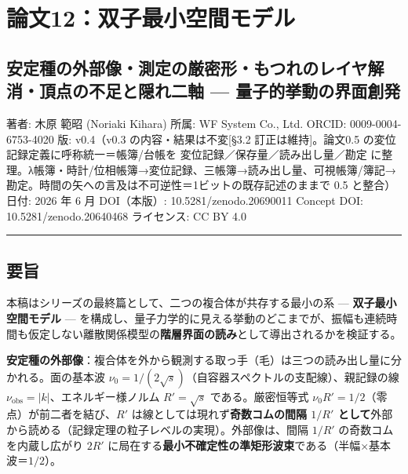 \documentclass[
]{ltjsarticle}
\author{}
\date{}
\begin{document}
\section{論文12：双子最小空間モデル}\label{ux8ad6ux658712ux53ccux5b50ux6700ux5c0fux7a7aux9593ux30e2ux30c7ux30eb}

\subsection{安定種の外部像・測定の厳密形・もつれのレイヤ解消・頂点の不足と隠れ二軸
---
量子的挙動の界面創発}\label{ux5b89ux5b9aux7a2eux306eux5916ux90e8ux50cfux6e2cux5b9aux306eux53b3ux5bc6ux5f62ux3082ux3064ux308cux306eux30ecux30a4ux30e4ux89e3ux6d88ux9802ux70b9ux306eux4e0dux8db3ux3068ux96a0ux308cux4e8cux8ef8-ux91cfux5b50ux7684ux6319ux52d5ux306eux754cux9762ux5275ux767a}

著者: 木原 範昭 (Noriaki Kihara) 所属: WF System Co., Ltd. ORCID:
0009-0004-6753-4020 版: v0.4（v0.3 の内容・結果は不変{[}§3.2
訂正は維持{]}。論文0.5 の変位記録定義に呼称統一＝帳簿/台帳を
変位記録／保存量／読み出し量／勘定
に整理。λ帳簿・時計/位相帳簿→変位記録、三帳簿→読み出し量、可視帳簿/簿記→勘定。時間の矢への言及は不可逆性＝1ビットの既存記述のままで
0.5 と整合） 日付: 2026 年 6 月 DOI（本版）: 10.5281/zenodo.20690011
Concept DOI: 10.5281/zenodo.20640468 ライセンス: CC BY 4.0

\begin{center}\rule{0.5\linewidth}{0.5pt}\end{center}

\subsection{要旨}\label{ux8981ux65e8}

本稿はシリーズの最終篇として、二つの複合体が共存する最小の系 ---
\textbf{双子最小空間モデル} ---
を構成し、量子力学的に見える挙動のどこまでが、振幅も連続時間も仮定しない離散関係模型の\textbf{階層界面の読み}として導出されるかを検証する。

\textbf{安定種の外部像}：複合体を外から観測する取っ手（毛）は三つの読み出し量に分かれる。面の基本波
\(\nu_0=1/(2\sqrt s)\)（自容器スペクトルの支配線）、親記録の線
\(\nu_{\mathrm{obs}}=|k|\)、エネルギー様ノルム \(R'=\sqrt s\)
である。厳密恒等式 \(\nu_0 R'=1/2\)（零点）が前二者を結び、\(R'\)
は線としては現れず\textbf{奇数コムの間隔 \(1/R'\)
として}外部から読める（記録定理の粒子レベルの実現）。外部像は、間隔
\(1/R'\) の奇数コムを内蔵し広がり \(2R'\)
に局在する\textbf{最小不確定性の準矩形波束}である（半幅×基本波＝\(1/2\)）。
\end{document}

